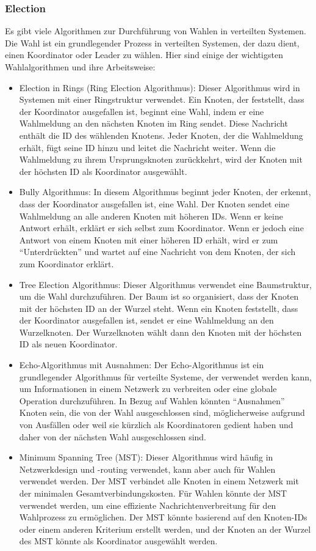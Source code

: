 \subsubsection{Election}
Es gibt viele Algorithmen zur Durchführung von Wahlen in verteilten Systemen. Die Wahl ist ein grundlegender Prozess in verteilten Systemen, der dazu dient, einen Koordinator oder Leader zu wählen. Hier sind einige der wichtigsten Wahlalgorithmen und ihre Arbeitsweise:
\begin{itemize}
\item Election in Rings (Ring Election Algorithmus): Dieser Algorithmus wird in Systemen mit einer Ringstruktur verwendet. Ein Knoten, der feststellt, dass der Koordinator ausgefallen ist, beginnt eine Wahl, indem er eine Wahlmeldung an den nächsten Knoten im Ring sendet. Diese Nachricht enthält die ID des wählenden Knotens. Jeder Knoten, der die Wahlmeldung erhält, fügt seine ID hinzu und leitet die Nachricht weiter. Wenn die Wahlmeldung zu ihrem Ursprungsknoten zurückkehrt, wird der Knoten mit der höchsten ID als Koordinator ausgewählt.
\item Bully Algorithmus: In diesem Algorithmus beginnt jeder Knoten, der erkennt, dass der Koordinator ausgefallen ist, eine Wahl. Der Knoten sendet eine Wahlmeldung an alle anderen Knoten mit höheren IDs. Wenn er keine Antwort erhält, erklärt er sich selbst zum Koordinator. Wenn er jedoch eine Antwort von einem Knoten mit einer höheren ID erhält, wird er zum \enquote{Unterdrückten} und wartet auf eine Nachricht von dem Knoten, der sich zum Koordinator erklärt.
\item Tree Election Algorithmus: Dieser Algorithmus verwendet eine Baumstruktur, um die Wahl durchzuführen. Der Baum ist so organisiert, dass der Knoten mit der höchsten ID an der Wurzel steht. Wenn ein Knoten feststellt, dass der Koordinator ausgefallen ist, sendet er eine Wahlmeldung an den Wurzelknoten. Der Wurzelknoten wählt dann den Knoten mit der höchsten ID als neuen Koordinator.
\item Echo-Algorithmus mit Ausnahmen: Der Echo-Algorithmus ist ein grundlegender Algorithmus für verteilte Systeme, der verwendet werden kann, um Informationen in einem Netzwerk zu verbreiten oder eine globale Operation durchzuführen. In Bezug auf Wahlen könnten \enquote{Ausnahmen} Knoten sein, die von der Wahl ausgeschlossen sind, möglicherweise aufgrund von Ausfällen oder weil sie kürzlich als Koordinatoren gedient haben und daher von der nächsten Wahl ausgeschlossen sind.
\item Minimum Spanning Tree (MST): Dieser Algorithmus wird häufig in Netzwerkdesign und -routing verwendet, kann aber auch für Wahlen verwendet werden. Der MST verbindet alle Knoten in einem Netzwerk mit der minimalen Gesamtverbindungskosten. Für Wahlen könnte der MST verwendet werden, um eine effiziente Nachrichtenverbreitung für den Wahlprozess zu ermöglichen. Der MST könnte basierend auf den Knoten-IDs oder einem anderen Kriterium erstellt werden, und der Knoten an der Wurzel des MST könnte als Koordinator ausgewählt werden.
\end{itemize}

